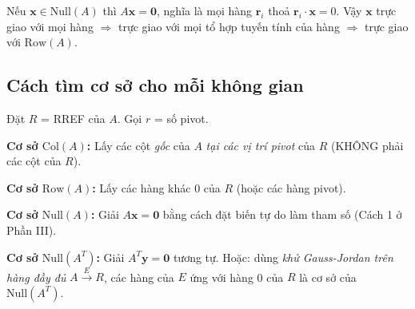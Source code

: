 \documentclass[12pt,a4paper]{article}
\begin{document}
\begin{ynghia}[title={Tại sao $\mathrm{Row}(A) \perp \mathrm{Null}(A)$?}]
Nếu $\mathbf{x} \in \mathrm{Null}(A)$ thì $A\mathbf{x} = \mathbf{0}$, nghĩa là mọi hàng $\mathbf{r}_i$ thoả $\mathbf{r}_i \cdot \mathbf{x} = 0$. Vậy $\mathbf{x}$ trực giao với mọi hàng $\Rightarrow$ trực giao với mọi tổ hợp tuyến tính của hàng $\Rightarrow$ trực giao với $\mathrm{Row}(A)$.
\end{ynghia}

\begin{center}
\end{center}

\subsection{Cách tìm cơ sở cho mỗi không gian}

\begin{phuongphap}[title={Tìm cơ sở của 4 không gian}]
Đặt $R$ = RREF của $A$. Gọi $r$ = số pivot.

\medskip
\textbf{Cơ sở $\mathrm{Col}(A)$:} Lấy các cột \emph{gốc} của $A$ \emph{tại các vị trí pivot} của $R$ (KHÔNG phải các cột của $R$).

\medskip
\textbf{Cơ sở $\mathrm{Row}(A)$:} Lấy các hàng khác 0 của $R$ (hoặc các hàng pivot).

\medskip
\textbf{Cơ sở $\mathrm{Null}(A)$:} Giải $A\mathbf{x} = \mathbf{0}$ bằng cách đặt biến tự do làm tham số (Cách 1 ở Phần III).

\medskip
\textbf{Cơ sở $\mathrm{Null}(A^T)$:} Giải $A^T\mathbf{y} = \mathbf{0}$ tương tự. Hoặc: dùng \emph{khử Gauss-Jordan trên hàng đầy đủ} $A \xrightarrow{E} R$, các hàng của $E$ ứng với hàng 0 của $R$ là cơ sở của $\mathrm{Null}(A^T)$.
\end{phuongphap}
\end{document}

